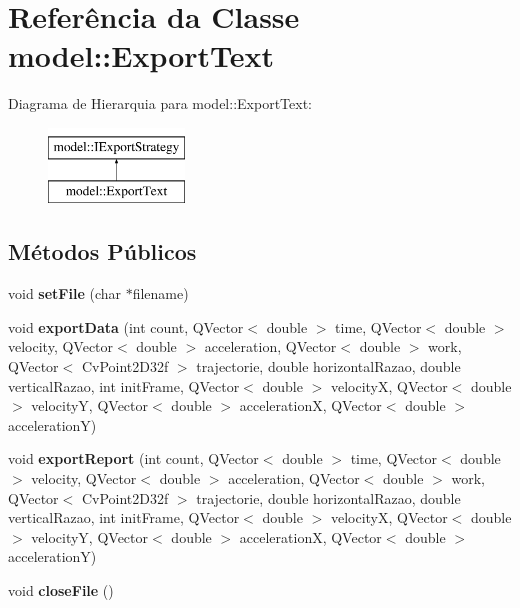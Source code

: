 \hypertarget{classmodel_1_1ExportText}{
\section{Referência da Classe model::ExportText}
\label{classmodel_1_1ExportText}
}
Diagrama de Hierarquia para model::ExportText:\begin{figure}[H]
\begin{center}
\leavevmode
\includegraphics[height=2.000000cm]{classmodel_1_1ExportText}
\end{center}
\end{figure}
\subsection*{Métodos Públicos}
\begin{DoxyCompactItemize}
\item 
\hypertarget{classmodel_1_1ExportText_a69546e170110cd50e751d903b12f6f00}{
void {\bfseries setFile} (char $\ast$filename)}
\label{classmodel_1_1ExportText_a69546e170110cd50e751d903b12f6f00}

\item 
\hypertarget{classmodel_1_1ExportText_a197f589850cb7d3e71a2320be8b2ea17}{
void {\bfseries exportData} (int count, QVector$<$ double $>$ time, QVector$<$ double $>$ velocity, QVector$<$ double $>$ acceleration, QVector$<$ double $>$ work, QVector$<$ CvPoint2D32f $>$ trajectorie, double horizontalRazao, double verticalRazao, int initFrame, QVector$<$ double $>$ velocityX, QVector$<$ double $>$ velocityY, QVector$<$ double $>$ accelerationX, QVector$<$ double $>$ accelerationY)}
\label{classmodel_1_1ExportText_a197f589850cb7d3e71a2320be8b2ea17}

\item 
\hypertarget{classmodel_1_1ExportText_ae882c742d21ac43a2492da884e8b99bc}{
void {\bfseries exportReport} (int count, QVector$<$ double $>$ time, QVector$<$ double $>$ velocity, QVector$<$ double $>$ acceleration, QVector$<$ double $>$ work, QVector$<$ CvPoint2D32f $>$ trajectorie, double horizontalRazao, double verticalRazao, int initFrame, QVector$<$ double $>$ velocityX, QVector$<$ double $>$ velocityY, QVector$<$ double $>$ accelerationX, QVector$<$ double $>$ accelerationY)}
\label{classmodel_1_1ExportText_ae882c742d21ac43a2492da884e8b99bc}

\item 
\hypertarget{classmodel_1_1ExportText_af55398dc07f2e89fea8572f89f027878}{
void {\bfseries closeFile} ()}
\label{classmodel_1_1ExportText_af55398dc07f2e89fea8572f89f027878}

\end{DoxyCompactItemize}


